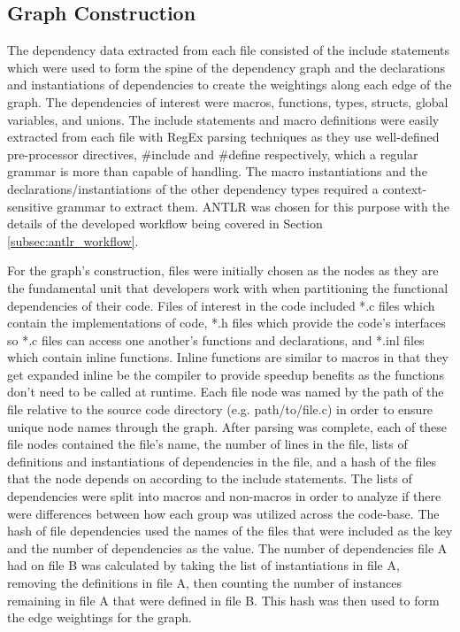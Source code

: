\subsection{Graph Construction}
\label{subsec:graph_construction}

The dependency data extracted from each file consisted of the include statements which were used to form the spine of the dependency graph and the declarations and instantiations of dependencies to create the weightings along each edge of the graph. The dependencies of interest were macros, functions, types, structs, global variables, and unions. The include statements and macro definitions were easily extracted from each file with RegEx parsing techniques as they use well-defined pre-processor directives, \#include and \#define respectively, which a regular grammar is more than capable of handling. The macro instantiations and the declarations/instantiations of the other dependency types required a context-sensitive grammar to extract them. ANTLR was chosen for this purpose with the details of the developed workflow being covered in Section \ref{subsec:antlr_workflow}.

For the graph's construction, files were initially chosen as the nodes as they are the fundamental unit that developers work with when partitioning the functional dependencies of their code. Files of interest in the code included *.c files which contain the implementations of code, *.h files which provide the code's interfaces so *.c files can access one another's functions and declarations, and *.inl files which contain inline functions. Inline functions are similar to macros in that they get expanded inline be the compiler to provide speedup benefits as the functions don't need to be called at runtime. Each file node was named by the path of the file relative to the source code directory (e.g. path/to/file.c) in order to ensure unique node names through the graph. After parsing was complete, each of these file nodes contained the file's name, the number of lines in the file, lists of definitions and instantiations of dependencies in the file, and a hash of the files that the node depends on according to the include statements. The lists of dependencies were split into macros and non-macros in order to analyze if there were differences between how each group was utilized across the code-base. The hash of file dependencies used the names of the files that were included as the key and the number of dependencies as the value. The number of dependencies file A had on file B was calculated by taking the list of instantiations in file A, removing the definitions in file A, then counting the number of instances remaining in file A that were defined in file B. This hash was then used to form the edge weightings for the graph.

